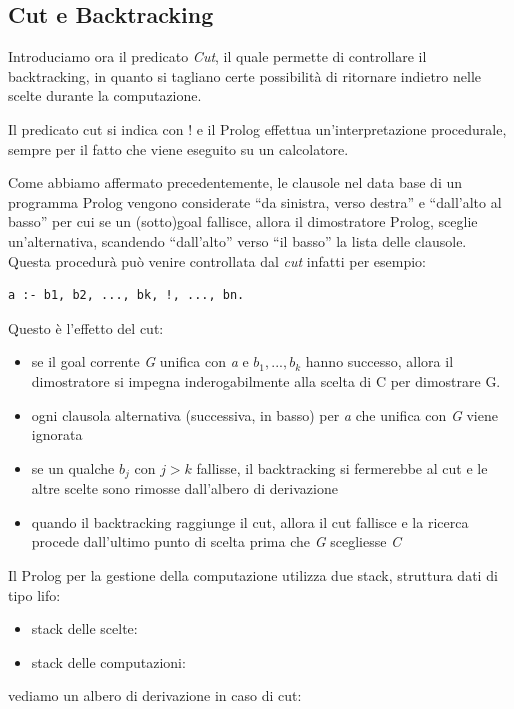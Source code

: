 \documentclass[a4paper]{report}
\begin{document}
\subsection{Cut e Backtracking}
Introduciamo ora il predicato \emph{Cut}, il quale permette di controllare il backtracking, in quanto si tagliano certe possibilità
di ritornare indietro nelle scelte durante la computazione.

Il predicato cut si indica con $!$ e il Prolog effettua un'interpretazione procedurale, sempre per il fatto che viene eseguito su un calcolatore.

Come abbiamo affermato precedentemente, le clausole nel data base di un programma Prolog vengono considerate “da sinistra, verso destra”
e “dall'alto al basso” per cui se un (sotto)goal fallisce, allora il dimostratore Prolog, sceglie un'alternativa,
scandendo “dall'alto” verso “il basso” la lista delle clausole.
Questa procedurà può venire controllata dal \textit{cut} infatti per esempio:
\begin{verbatim}
a :- b1, b2, ..., bk, !, ..., bn.
\end{verbatim}
Questo è l'effetto del cut:
\begin{itemize}
\item se il goal corrente \textit{G} unifica con \textit{a} e $b_1,...,b_k$ hanno successo,
      allora il dimostratore si impegna inderogabilmente alla scelta di C per dimostrare G.
\item ogni clausola alternativa (successiva, in basso) per \textit{a} che unifica con \textit{G} viene ignorata
\item se un qualche $b_j$ con $j > k$ fallisse, il backtracking si fermerebbe al cut e le altre scelte sono rimosse dall'albero di derivazione
\item quando il backtracking raggiunge il cut, allora il cut fallisce e la ricerca procede dall’ultimo punto di scelta
      prima che \textit{G} scegliesse \textit{C}
\end{itemize}
Il Prolog per la gestione della computazione utilizza due stack, struttura dati di tipo lifo:
\begin{itemize}
\item stack delle scelte:
\item stack delle computazioni:
\end{itemize}
vediamo un albero di derivazione in caso di cut:
\end{document}
